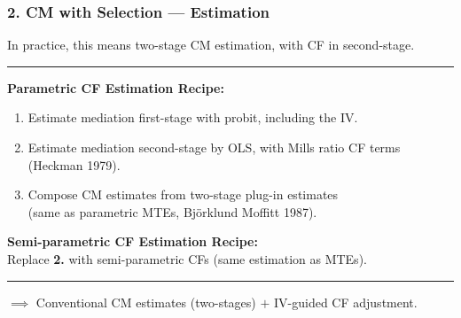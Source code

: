 \documentclass[dvipsnames]{beamer} %
\begin{document}
\begin{frame}
    \frametitle{2. CM with Selection --- Estimation}
    In practice, this means two-stage CM estimation, with CF in second-stage.

    \par\noindent\rule{\textwidth}{0.4pt}
    \textbf{Parametric CF Estimation Recipe:}
    \begin{enumerate}
        \item Estimate mediation first-stage with probit, including the IV.
        \item Estimate mediation second-stage by OLS, with Mills ratio CF terms (Heckman 1979).
        \item Compose CM estimates from two-stage plug-in estimates
        \\(same as parametric MTEs, Bj{\"o}rklund Moffitt 1987).
    \end{enumerate}

    \vskip0.5cm
    \textcolor{gray!25}{
        \textbf{Semi-parametric CF Estimation Recipe:} \\
        Replace \textbf{2.} with semi-parametric CFs
        (same estimation as MTEs).}

    \vfill

    \par\noindent\rule{\textwidth}{0.4pt}
    $\implies$ Conventional CM estimates (two-stages) $+$ IV-guided CF adjustment.
\end{frame}
\end{document}
